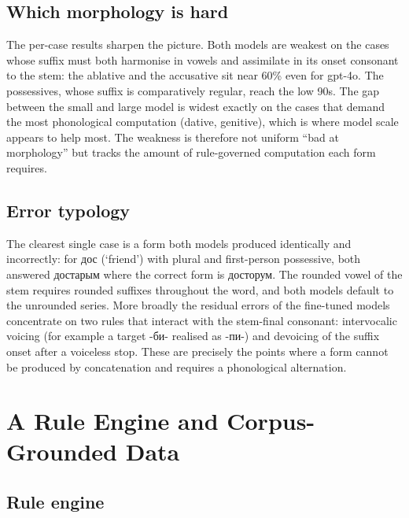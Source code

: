 \documentclass[11pt]{article}
\newcommand{\ky}[1]{\foreignlanguage{russian}{#1}}
\begin{document}
\subsection{Which morphology is hard}

The per-case results sharpen the picture. Both models are weakest on the cases whose
suffix must both harmonise in vowels and assimilate in its onset consonant to the
stem: the ablative and the accusative sit near 60\% even for gpt-4o. The possessives,
whose suffix is comparatively regular, reach the low 90s. The gap between the small and
large model is widest exactly on the cases that demand the most phonological
computation (dative, genitive), which is where model scale appears to help most. The
weakness is therefore not uniform ``bad at morphology'' but tracks the amount of
rule-governed computation each form requires.

\subsection{Error typology}

The clearest single case is a form both models produced identically and incorrectly:
for \ky{дос} (`friend') with plural and first-person possessive, both answered
\ky{достарым} where the correct form is \ky{досторум}. The rounded vowel of the stem
requires rounded suffixes throughout the word, and both models default to the
unrounded series. More broadly the residual errors of the fine-tuned models concentrate
on two rules that interact with the stem-final consonant: intervocalic voicing (for
example a target \ky{-би-} realised as \ky{-пи-}) and devoicing of the suffix onset
after a voiceless stop. These are precisely the points where a form cannot be produced
by concatenation and requires a phonological alternation.

\section{A Rule Engine and Corpus-Grounded Data}
\label{sec:data}

\subsection{Rule engine}
\end{document}
